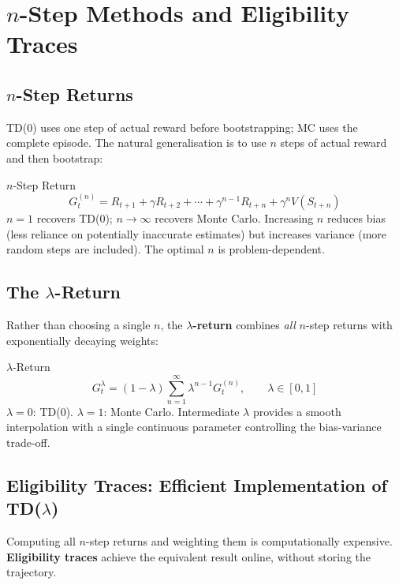 \documentclass[11pt,a4paper]{article}
\newcommand{\term}[1]{\textcolor{DefGreen}{\textbf{#1}}}
\begin{document}
\section{$n$-Step Methods and Eligibility Traces}

\subsection{$n$-Step Returns}

TD(0) uses one step of actual reward before bootstrapping; MC uses the complete episode. The natural generalisation is to use $n$ steps of actual reward and then bootstrap:

\begin{defbox}{$n$-Step Return}
\[
G_t^{(n)} = R_{t+1}+\gamma R_{t+2}+\cdots+\gamma^{n-1}R_{t+n}+\gamma^n V(S_{t+n})
\]
$n=1$ recovers TD(0); $n\to\infty$ recovers Monte Carlo. Increasing $n$ reduces bias (less reliance on potentially inaccurate estimates) but increases variance (more random steps are included). The optimal $n$ is problem-dependent.
\end{defbox}

\subsection{The $\lambda$-Return}

Rather than choosing a single $n$, the \term{$\lambda$-return} combines \emph{all} $n$-step returns with exponentially decaying weights:

\begin{defbox}{$\lambda$-Return}
\[
G_t^\lambda = (1-\lambda)\sum_{n=1}^{\infty}\lambda^{n-1}G_t^{(n)}, \qquad \lambda\in[0,1]
\]
$\lambda=0$: TD(0). $\lambda=1$: Monte Carlo. Intermediate $\lambda$ provides a smooth interpolation with a single continuous parameter controlling the bias-variance trade-off.
\end{defbox}

\subsection{Eligibility Traces: Efficient Implementation of TD($\lambda$)}

Computing all $n$-step returns and weighting them is computationally expensive. \term{Eligibility traces} achieve the equivalent result online, without storing the trajectory.
\end{document}
